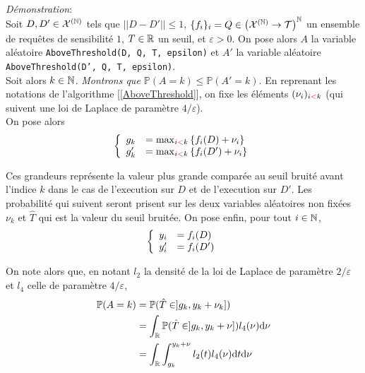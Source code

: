 \textit{Démonstration}:\\
Soit \(D, D' \in \mathcal X^{(\mathbb{N})}\) tels que \(||D - D'|| \leq 1\), \(\{f_i\}_i = Q \in \left( \mathcal X^{(\mathbb{N})} \to  \mathcal T \right)^{\mathbb{N}}\) un ensemble de requêtes de sensibilité \(1\), \(T \in \mathbb{R}\) un seuil, et \(\varepsilon > 0\). On pose alors \(A\) la variable aléatoire \texttt{AboveThreshold(D, Q, T, epsilon)} et \(A'\) la variable aléatoire \texttt{AboveThreshold(D', Q, T, epsilon)}.\\

Soit alors \(k \in \mathbb{N}\). \textit{Montrons que \(\mathbb P (A = k) \leq \mathbb P(A' = k)\)}. En reprenant les notations de l'algorithme [\ref{AboveThreshold}], on fixe les éléments \((\nu_i)_{i {\color{magenta} <} k}\) (qui suivent une loi de {\sc Laplace} de paramètre \(4/\varepsilon\)).\\


On pose alors
\[
    \left\{ 
        \begin{array}[]{rl}
            g_k & = \max_{i {\color{magenta} <} k} \left\{ f_i(D) + \nu_i\right\}\\
            g_k' & = \max_{i {\color{magenta} <} k} \left\{ f_i(D') + \nu_i\right\}\\
        \end{array}
    \right.    
\]

Ces grandeurs représente la valeur plus grande comparée au seuil bruité avant l'indice \(k\) dans le cas de l'execution sur \(D\) et de l'execution sur \(D'\). Les probabilité qui suivent seront prisent sur les deux variables aléatoires non fixées \(\nu_k\) et \(\hat T\) qui est la valeur du seuil bruitée. On pose enfin, pour tout \(i \in \mathbb{N}\),
\[
    \left\{ 
        \begin{array}[]{rl}
            y_i & = f_i(D)\\
            y_i' & = f_i(D')\\
        \end{array}
    \right.    
\]


On note alors que, en notant \(l_2\) la densité de la loi de {\sc Laplace} de paramètre \(2/\varepsilon\) et \(l_4\) celle de paramètre \(4/\varepsilon\),
\begin{align*}
    \mathbb P(A = k) & = \mathbb P(\hat T \in ]g_k, y_k + \nu_k])\\
    & = \int_{\mathbb{R}} \mathbb P(\hat T \in ]g_k, y_k + \nu])l_4(\nu) \mathrm{d} \nu \\
    & = \int_{\mathbb{R}}\int_{g_k}^{y_k + \nu} l_2(t)l_4(\nu) \mathrm{d} t \mathrm{d} \nu 
\end{align*}

